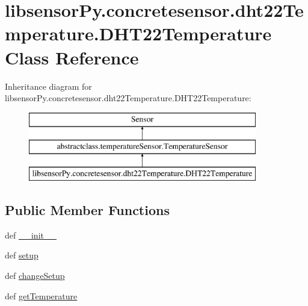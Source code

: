 \hypertarget{classlibsensorPy_1_1concretesensor_1_1dht22Temperature_1_1DHT22Temperature}{}\section{libsensor\+Py.\+concretesensor.\+dht22\+Temperature.\+D\+H\+T22\+Temperature Class Reference}
\label{classlibsensorPy_1_1concretesensor_1_1dht22Temperature_1_1DHT22Temperature}
Inheritance diagram for libsensor\+Py.\+concretesensor.\+dht22\+Temperature.\+D\+H\+T22\+Temperature\+:\begin{figure}[H]
\begin{center}
\leavevmode
\includegraphics[height=3.000000cm]{classlibsensorPy_1_1concretesensor_1_1dht22Temperature_1_1DHT22Temperature}
\end{center}
\end{figure}
\subsection*{Public Member Functions}
\begin{DoxyCompactItemize}
\item 
def \hyperlink{classlibsensorPy_1_1concretesensor_1_1dht22Temperature_1_1DHT22Temperature_aa01ebcffa8f8401137653b725e1e9fe1}{\+\_\+\+\_\+init\+\_\+\+\_\+}
\item 
def \hyperlink{classlibsensorPy_1_1concretesensor_1_1dht22Temperature_1_1DHT22Temperature_a80a82c6f852e93ae538112f5a8b4868e}{setup}
\item 
def \hyperlink{classlibsensorPy_1_1concretesensor_1_1dht22Temperature_1_1DHT22Temperature_a12cc8bce9ce587b0bc2d88fa320bb686}{change\+Setup}
\item 
def \hyperlink{classlibsensorPy_1_1concretesensor_1_1dht22Temperature_1_1DHT22Temperature_a76122d41471d012d954a30229878999c}{get\+Temperature}
\end{DoxyCompactItemize}
